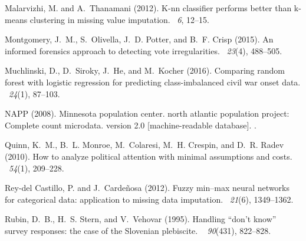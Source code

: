 \documentclass[10pt]{book}
\theoremstyle{definition}
\begin{document}
\begin{thebibliography}{11}
Malarvizhi, M. and A.~Thanamani (2012).
\newblock K-nn classifier performs better than k-means clustering in missing
  value imputation.
~{\em 6},
  12--15.

Montgomery, J.~M., S.~Olivella, J.~D. Potter, and B.~F. Crisp (2015).
\newblock An informed forensics approach to detecting vote irregularities.
~{\em 23\/}(4), 488--505.

Muchlinski, D., D.~Siroky, J.~He, and M.~Kocher (2016).
\newblock Comparing random forest with logistic regression for predicting
  class-imbalanced civil war onset data.
~{\em 24\/}(1), 87--103.

NAPP (2008).
\newblock Minnesota population center. north atlantic population project:
  Complete count microdata. version 2.0 [machine-readable database].
.

Quinn, K.~M., B.~L. Monroe, M.~Colaresi, M.~H. Crespin, and D.~R. Radev (2010).
\newblock How to analyze political attention with minimal assumptions and
  costs.
~{\em 54\/}(1),
  209--228.

Rey-del Castillo, P. and J.~Carde{\~n}osa (2012).
\newblock Fuzzy min--max neural networks for categorical data: application to
  missing data imputation.
~{\em 21\/}(6), 1349--1362.

Rubin, D.~B., H.~S. Stern, and V.~Vehovar (1995).
\newblock Handling \enquote{don't know} survey responses: the case of the
  {S}lovenian plebiscite.
~{\em
  90\/}(431), 822--828.


\end{thebibliography}
\end{document}
